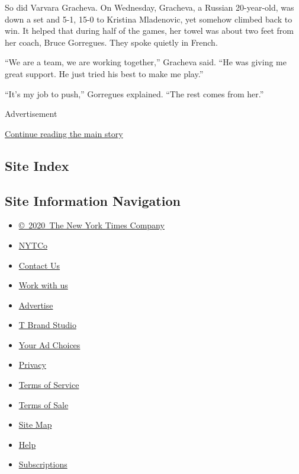 So did Varvara Gracheva. On Wednesday, Gracheva, a Russian 20-year-old,
was down a set and 5-1, 15-0 to Kristina Mladenovic, yet somehow climbed
back to win. It helped that during half of the games, her towel was
about two feet from her coach, Bruce Gorregues. They spoke quietly in
French.

``We are a team, we are working together,'' Gracheva said. ``He was
giving me great support. He just tried his best to make me play.''

``It's my job to push,'' Gorregues explained. ``The rest comes from
her.''

Advertisement

\protect\hyperlink{after-bottom}{Continue reading the main story}

\hypertarget{site-index}{%
\subsection{Site Index}\label{site-index}}

\hypertarget{site-information-navigation}{%
\subsection{Site Information
Navigation}\label{site-information-navigation}}

\begin{itemize}
\tightlist
\item
  \href{https://help.nytimes3xbfgragh.onion/hc/en-us/articles/115014792127-Copyright-notice}{©~2020~The
  New York Times Company}
\end{itemize}

\begin{itemize}
\tightlist
\item
  \href{https://www.nytco.com/}{NYTCo}
\item
  \href{https://help.nytimes3xbfgragh.onion/hc/en-us/articles/115015385887-Contact-Us}{Contact
  Us}
\item
  \href{https://www.nytco.com/careers/}{Work with us}
\item
  \href{https://nytmediakit.com/}{Advertise}
\item
  \href{http://www.tbrandstudio.com/}{T Brand Studio}
\item
  \href{https://www.nytimes3xbfgragh.onion/privacy/cookie-policy\#how-do-i-manage-trackers}{Your
  Ad Choices}
\item
  \href{https://www.nytimes3xbfgragh.onion/privacy}{Privacy}
\item
  \href{https://help.nytimes3xbfgragh.onion/hc/en-us/articles/115014893428-Terms-of-service}{Terms
  of Service}
\item
  \href{https://help.nytimes3xbfgragh.onion/hc/en-us/articles/115014893968-Terms-of-sale}{Terms
  of Sale}
\item
  \href{https://spiderbites.nytimes3xbfgragh.onion}{Site Map}
\item
  \href{https://help.nytimes3xbfgragh.onion/hc/en-us}{Help}
\item
  \href{https://www.nytimes3xbfgragh.onion/subscription?campaignId=37WXW}{Subscriptions}
\end{itemize}
